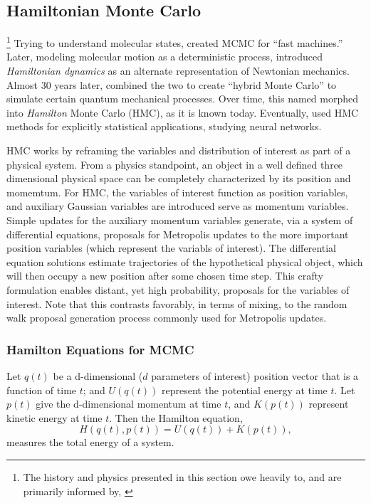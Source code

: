 \subsection{Hamiltonian Monte Carlo} %

\footnote{The history and physics presented in this section owe heavily to, and are primarily informed by, \citep{Neal2011}} Trying to understand molecular states, \cite{Metropolis1953} created MCMC for ``fast machines.'' Later, modeling molecular motion as a deterministic process, \cite{Alder1959} introduced {\it Hamiltonian dynamics} as an alternate representation of Newtonian mechanics. Almost 30 years later, \cite{Duane1987} combined the two to create ``hybrid Monte Carlo'' to simulate certain quantum mechanical processes. Over time, this named morphed into {\it Hamilton} Monte Carlo (HMC), as it is known today. Eventually, \cite{Neal1996} used HMC methods for explicitly statistical applications, studying neural networks.

HMC works by reframing the variables and distribution of interest as part of a physical system. From a physics standpoint, an object in a well defined three dimensional physical space can be completely characterized by its position and momemtum. For HMC, the variables of interest function as position variables, and auxiliary Gaussian variables are introduced serve as momentum variables. Simple updates for the auxiliary momentum variables generate, via a system of differential equations, proposals for Metropolis updates to the more important position variables (which represent the variabls of interest). The differential equation solutions estimate trajectories of the hypothetical physical object, which will then occupy a new position after some chosen time step. This crafty formulation enables distant, yet high probability, proposals for the variables of interest. Note that this contrasts favorably, in terms of mixing, to the random walk proposal generation process commonly used for Metropolis updates.

\subsubsection{Hamilton Equations for MCMC} %

Let $q(t)$ be a d-dimensional ($d$ parameters of interest) position vector that is a function of time $t$; and $U(q(t))$ represent the potential energy at time $t$. Let $p(t)$ give the d-dimensional momentum at time $t$, and $K(p(t))$ represent kinetic energy at time $t$. Then the Hamilton equation,
\begin{equation}
H(q(t),p(t)) = U(q(t)) + K(p(t)),
\end{equation}
measures the total energy of a system. 

